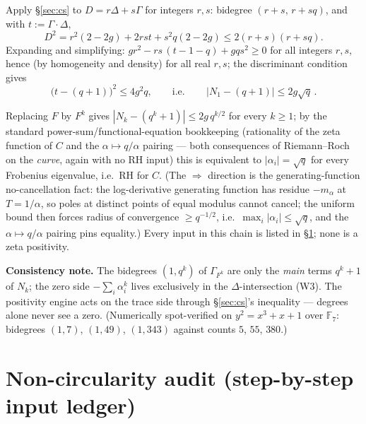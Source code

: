 \documentclass[11pt]{article}
\theoremstyle{definition}
\theoremstyle{remark}
\begin{document}
Apply \S\ref{sec:cs} to $D = r\Delta + s\Gamma$ for integers $r, s$: bidegree
$(r + s,\, r + sq)$, and with $t := \Gamma \cdot \Delta$,
\[
D^2 = r^2 (2 - 2g) + 2rst + s^2 q (2 - 2g) \le 2 (r + s)(r + sq).
\]
Expanding and simplifying: $g r^2 - rs\,(t - 1 - q) + g q s^2 \ge 0$ for all integers
$r, s$, hence (by homogeneity and density) for all real $r, s$; the discriminant condition
gives
\[
\bigl(t - (q + 1)\bigr)^2 \le 4 g^2 q,
\qquad \text{i.e.} \qquad
\boxed{\,|N_1 - (q + 1)| \le 2g \sqrt{q}\,.}
\]

Replacing $F$ by $F^k$ gives $|N_k - (q^k + 1)| \le 2g\, q^{k/2}$ for every $k \ge 1$; by
the standard power-sum/functional-equation bookkeeping (rationality of the zeta function of
$C$ and the $\alpha \mapsto q/\alpha$ pairing --- both consequences of Riemann--Roch on the
\emph{curve}, again with no RH input) this is equivalent to $|\alpha_i| = \sqrt{q}$ for
every Frobenius eigenvalue, i.e.\ RH for $C$. (The $\Longrightarrow$ direction is the
generating-function no-cancellation fact: the log-derivative generating function has residue
$-m_{\alpha}$ at $T = 1/\alpha$, so poles at distinct points of equal modulus cannot cancel;
the uniform bound then forces radius of convergence $\ge q^{-1/2}$, i.e.\
$\max_i |\alpha_i| \le \sqrt{q}$, and the $\alpha \mapsto q/\alpha$ pairing pins equality.)
Every input in this chain is listed in \S\ref{sec:ledger}; none is a zeta positivity.

\medskip

\noindent\textbf{Consistency note.} The bidegrees $(1, q^k)$ of $\Gamma_{F^k}$ are only the
\emph{main} terms $q^k + 1$ of $N_k$; the zero side $-\sum_i \alpha_i^k$ lives exclusively
in the $\Delta$-intersection (W3). The positivity engine acts on the trace side through
\S\ref{sec:cs}'s inequality --- degrees alone never see a zero. (Numerically spot-verified
on $y^2 = x^3 + x + 1$ over $\mathbb{F}_7$: bidegrees $(1, 7)$, $(1, 49)$, $(1, 343)$
against counts $5$, $55$, $380$.)

\section{Non-circularity audit (step-by-step input ledger)}
\label{sec:ledger}
\end{document}
